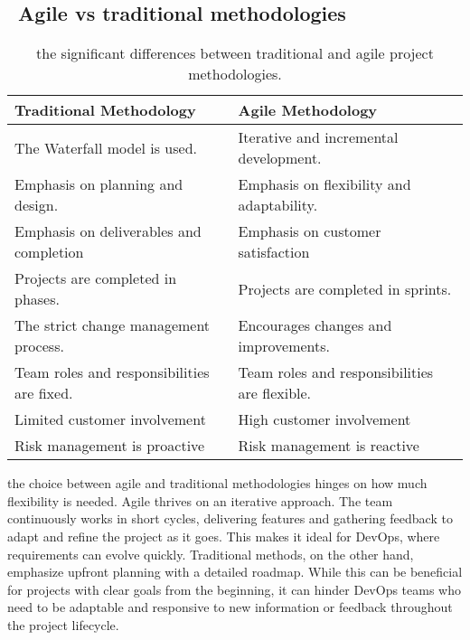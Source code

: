 \subsection*{ \textbullet\ Agile vs traditional methodologies}
\begin{longtable}[c]{
    |p{}
    |p{}|
    }
    \caption{the significant differences between traditional and agile project methodologies. \cite{TradvsAgile1}}
    \label{tab:traditional_vs_agile}                                                           \\
    \hline
    \textbf{ Traditional Methodology }         & \textbf{ Agile Methodology }                  \\
    \hline
    The Waterfall model is used.               & Iterative and incremental development.        \\
    \hline
    Emphasis on planning and design.           & Emphasis on flexibility and adaptability.     \\
    \hline
    Emphasis on deliverables and completion    & Emphasis on customer satisfaction             \\
    \hline
    Projects are completed in phases.          & Projects are completed in sprints.            \\
    \hline
    The strict change management process.      & Encourages changes and improvements.          \\
    \hline
    Team roles and responsibilities are fixed. & Team roles and responsibilities are flexible. \\
    \hline
    Limited customer involvement               & High customer involvement                     \\
    \hline
    Risk management is proactive               & Risk management is reactive                   \\
    \hline
\end{longtable}
the choice between agile and traditional methodologies hinges on how much flexibility is needed. Agile thrives on an iterative approach. The team continuously works in short cycles, delivering features and gathering feedback to adapt and refine the project as it goes. This makes it ideal for DevOps, where requirements can evolve quickly. Traditional methods, on the other hand, emphasize upfront planning with a detailed roadmap. While this can be beneficial for projects with clear goals from the beginning, it can hinder DevOps teams who need to be adaptable and responsive to new information or feedback throughout the project lifecycle.
